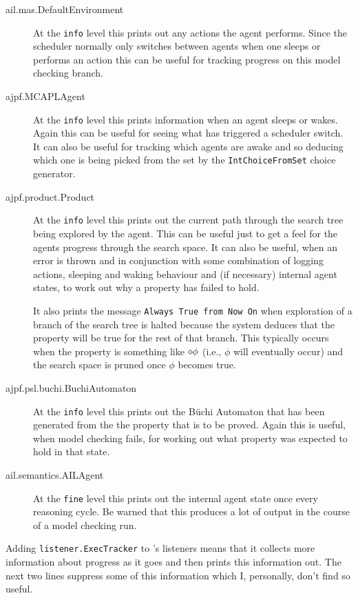 \documentclass[a4]{article}
\begin{document}
{{\begin{sloppypar}
\begin{description}
\begin{description}
\item[ail.mas.DefaultEnvironment] At the \texttt{info} level this prints out any actions the agent performs.  Since the scheduler normally only switches between agents when one sleeps or performs an action this can be useful for tracking progress on this model checking branch.
\item[ajpf.MCAPLAgent] At the \texttt{info} level this prints information when an agent sleeps or wakes.  Again this can be useful for seeing what has triggered a scheduler switch.  It can also be useful for tracking which agents are awake and so deducing which one is being picked from the set by the \texttt{IntChoiceFromSet} choice generator.
\item[ajpf.product.Product] At the \texttt{info} level this prints out the current path through the search tree being explored by the agent.  This can be useful just to get a feel for the agents progress through the search space.  It can also be useful, when an error is thrown and in conjunction with some combination of logging actions, sleeping and waking behaviour and (if necessary) internal agent states, to work out why a property has failed to hold.

It also prints the message \texttt{Always True from Now On} when exploration of a branch of the search tree is halted because the system deduces that the property will be true for the rest of that branch.  This typically occurs when the property is something like $\diamond \phi$ (i.e., $\phi$ will eventually occur) and the search space is pruned once $\phi$ becomes true.
\item[ajpf.psl.buchi.BuchiAutomaton] At the \texttt{info} level this prints out the B\"{u}chi Automaton that has been generated from the the property that is to be proved.  Again this is useful, when model checking fails, for working out what property was expected to hold in that state.
\item[ail.semantics.AILAgent] At the \texttt{fine} level this prints out the internal agent state once every reasoning cycle.  Be warned that this produces a lot of output in the course of a model checking run.
\end{description}
\item[listener+=,.listener.ExecTracker] Adding \texttt{listener.ExecTracker} to \jpf's listeners means that it collects more information about progress as it goes and then prints this information out.  The next two lines suppress some of this information which I, personally, don't find so useful. 
\end{description}
\end{sloppypar}

}}
\end{document}
